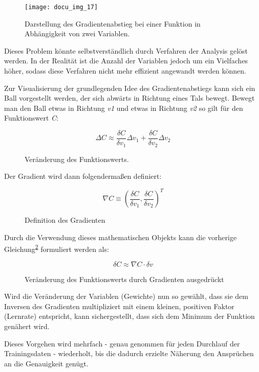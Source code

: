 \begin{figure}[h]
    \centering
    \texttt{[image: docu\_img\_17]}
    \caption{Darstellung des Gradientenabstieg bei einer Funktion in Abhängigkeit von zwei Variablen.}
    \label{fig:gradient-decent-3d}
\end{figure}

Dieses Problem könnte selbstverständlich durch Verfahren der Analysis gelöst werden. In der Realität ist die Anzahl der
Variablen jedoch um ein Vielfaches höher, sodass diese Verfahren nicht mehr effizient angewandt werden können.

Zur Visualisierung der grundlegenden Idee des Gradientenabstiegs kann sich ein Ball vorgestellt werden, der sich abwärts
in Richtung eines Tals bewegt. Bewegt man den Ball etwas in Richtung \textit{v1} und etwas in Richtung \textit{v2}
so gilt für den Funktionswert \textit{C}:

\begin{figure}[h]
    \centering
    \[ \Delta C \approx
          \frac{\delta C}{\delta v_1} \Delta v_1 + \frac{\delta C}{\delta v_2} \Delta v_2
    \]
    \caption{Veränderung des Funktionswerts.}
    \label{fig:gradient-decent-definition}
\end{figure}

Der Gradient wird dann folgendermaßen definiert:

\begin{figure}[h]
    \centering
    \[ \nabla C \equiv
        (\frac{\delta C}{\delta v_1},\frac{\delta C}{\delta v_2})^T
    \]
    \caption{Definition des Gradienten}
    \label{fig:gradient-decent-definition-2}
\end{figure}

Durch die Verwendung dieses mathematischen Objekts kann die vorherige Gleichung\textsuperscript{\ref{fig:gradient-decent-definition}} formuliert werden als:

\begin{figure}[h]
    \centering
    \[ \delta C \approx
        \nabla C \cdot \delta v
    \]
    \caption{Veränderung des Funktionswerts durch Gradienten ausgedrückt}
    \label{fig:gradient-decent-definition-3}
\end{figure}

Wird die Veränderung der Variablen (Gewichte) nun so gewählt, dass sie dem Inversen des Gradienten multipliziert mit
einem kleinen, positiven Faktor (Lernrate) entspricht, kann sichergestellt, dass sich dem Minimum der Funktion
genähert wird.

Dieses Vorgehen wird mehrfach - genau genommen für jeden Durchlauf der Trainingsdaten - wiederholt, bis die dadurch erzielte Näherung den
Ansprüchen an die Genauigkeit genügt.


